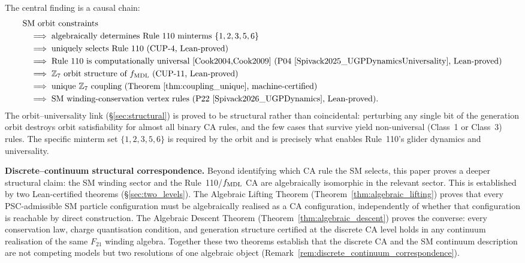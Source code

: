 \documentclass[11pt]{article}
\theoremstyle{remark}
\begin{document}
The central finding is a causal chain:
\begin{equation}
\begin{aligned}
&\text{SM orbit constraints}\\
&\quad\Longrightarrow\;\text{algebraically determines Rule~110 minterms } \{1,2,3,5,6\}\\
&\quad\Longrightarrow\;\text{uniquely selects Rule~110 (CUP-4, Lean-proved)}\\
&\quad\Longrightarrow\;\text{Rule~110 is computationally universal~\cite{Cook2004,Cook2009} (P04~\cite{Spivack2025_UGPDynamicsUniversality}, Lean-proved)}\\
&\quad\Longrightarrow\;\text{$\mathbb{Z}_7$ orbit structure of $f_{\rm MDL}$ (CUP-11, Lean-proved)}\\
&\quad\Longrightarrow\;\text{unique $\mathbb{Z}_7$ coupling (Theorem~\ref{thm:coupling_unique}, machine-certified)}\\
&\quad\Longrightarrow\;\text{SM winding-conservation vertex rules (P22~\cite{Spivack2026_UGPDynamics}, Lean-proved)}.
\end{aligned}
\label{eq:causal_chain}
\end{equation}
The orbit--universality link (\S\ref{sec:structural}) is proved to be structural rather
than coincidental: perturbing any single bit of the generation orbit destroys orbit
satisfiability for almost all binary CA rules, and the few cases that survive yield
non-universal (Class~1 or Class~3) rules. The specific minterm set $\{1,2,3,5,6\}$ is
required by the orbit and is precisely what enables Rule~110's glider dynamics and universality.

\medskip

\textbf{Discrete--continuum structural correspondence.}
Beyond identifying which CA rule the SM selects, this paper proves a deeper structural claim: the SM winding sector and the Rule~110/$f_{\rm MDL}$ CA are algebraically isomorphic in the relevant sector.
This is established by two Lean-certified theorems (§\ref{sec:two_levels}).
The Algebraic Lifting Theorem (Theorem~\ref{thm:algebraic_lifting}) proves that every PSC-admissible SM particle configuration must be algebraically realised as a CA configuration, independently of whether that configuration is reachable by direct construction.
The Algebraic Descent Theorem (Theorem~\ref{thm:algebraic_descent}) proves the converse: every conservation law, charge quantisation condition, and generation structure certified at the discrete CA level holds in any continuum realisation of the same $F_{21}$ winding algebra.
Together these two theorems establish that the discrete CA and the SM continuum description are not competing models but two resolutions of one algebraic object (Remark~\ref{rem:discrete_continuum_correspondence}).
\end{document}
